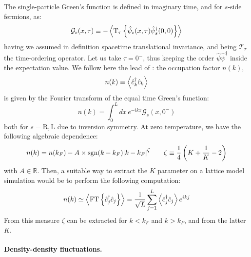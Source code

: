 The single-particle Green's function is defined in imaginary time, and for $s$-side fermions, as:
\[
	\mathcal{G}_s (x,\tau) \equiv - \ev{\mathrm{T}_\tau \left\{ \hat \psi_s (x,\tau) \hat \psi_s ^\dagger (0,0) \right\}}
\]
having we assumed in definition spacetime translational invariance, and being $\mathcal{T}_\tau$ the time-ordering operator. Let us take $\tau = 0^-$, thus keeping the order $\hat \psi \hat \psi^\dagger$ inside the expectation value. We follow here the lead of \cite{giamarchi2003quantum, Senechal:1999us}: the occupation factor $n(k)$,
\[
	n(k) \equiv \ev{\hat c_k^\dagger \hat c_k}
\]
is given by the Fourier transform of the equal time Green's function:
\[
	n(k) = \int_0^L dx \, e^{-ikx} \mathcal{G}_s (x,0^-)
\]
both for $s=\mathrm{R}, \mathrm{L}$ due to inversion symmetry. At zero temperature, we have the following algebraic dependence:
\[
	n(k) = n(k_F) - A \times \mathrm{sgn}(k-k_F) \abs{k-k_F}^\zeta
	\qquad
	\zeta \equiv \frac{1}{4} \left( K + \frac{1}{K} - 2 \right)
\]
with $A \in \mathbb{R}$. Then, a suitable way to extract the $K$ parameter on a lattice model simulation would be to perform the following computation:
\[
	n(k) \simeq \ev{ \mathrm{FT} \left\{ \hat c_j^\dagger \hat c_j \right\} } = \frac{1}{\sqrt{L}} \sum_{j=1}^L \ev{ \hat c_j^\dagger \hat c_j } e^{i k j}
\]
From this measure $\zeta$ can be extracted for $k<k_F$ and $k>k_F$, and from the latter $K$.

\paragraph{Density-density fluctuations.}

\todo

